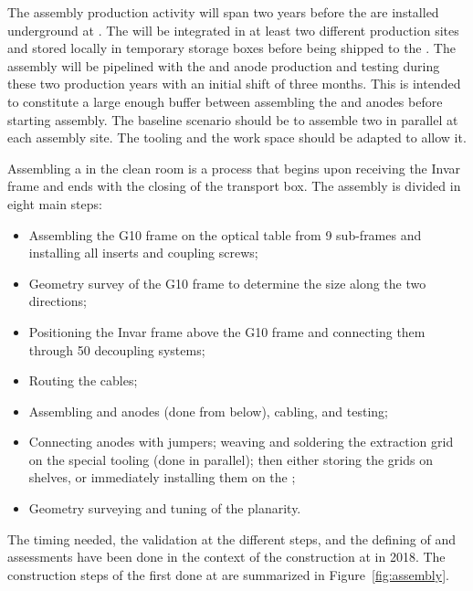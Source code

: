 The  assembly production activity will span two years 
before the  are installed underground at . The  will be integrated in at least two different production sites and stored locally in temporary storage boxes before being shipped to the . 
The  assembly will be pipelined with the  and anode production and testing during these two production years with an initial  shift of three months. This is intended to constitute a large enough buffer between assembling the  and anodes before starting  assembly. The baseline scenario should be to assemble two  in parallel at each assembly site. The tooling and the work space should be adapted to allow it.


Assembling a  in the clean room is a process that begins upon receiving the Invar frame and ends with the  closing of the transport box. 
The  assembly is divided in eight main steps:
\begin{itemize}
    \item  Assembling the G10 frame on the optical table from \num{9} sub-frames  and installing all inserts and coupling screws;
\item Geometry survey of the G10 frame to determine the size along the two directions;
\item Positioning the Invar frame  
above the G10 frame and connecting them through \num{50} decoupling systems;
\item Routing the   cables;
\item Assembling  and anodes (done from below), cabling, and  testing;
\item Connecting anodes with jumpers;
 weaving and soldering the extraction grid on the special tooling (done in parallel); then either storing the grids on shelves, or immediately installing them on the ;
\item Geometry surveying and tuning of the planarity.
\end{itemize}

The timing needed, the validation at the different steps, and the defining of  and assessments have been done in the context of the   construction at  in \num{2018}. The construction  steps of the first  done at  are summarized in Figure~\ref{fig:assembly}.

